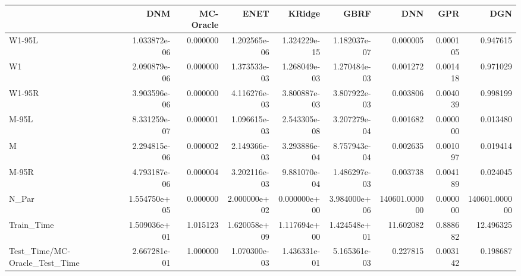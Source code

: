 \begin{tabular}{lrrrrrrrr}
\toprule
{} &           DNM &  MC-Oracle &          ENET &        KRidge &          GBRF &            DNN &       GPR &            DGN \\
\midrule
W1-95L                        &  1.033872e-06 &   0.000000 &  1.202565e-06 &  1.324229e-15 &  1.182037e-07 &       0.000005 &  0.000105 &       0.947615 \\
W1                            &  2.090879e-06 &   0.000000 &  1.373533e-03 &  1.268049e-03 &  1.270484e-03 &       0.001272 &  0.001418 &       0.971029 \\
W1-95R                        &  3.903596e-06 &   0.000000 &  4.116276e-03 &  3.800887e-03 &  3.807922e-03 &       0.003806 &  0.004039 &       0.998199 \\
M-95L                         &  8.331259e-07 &   0.000001 &  1.096615e-03 &  2.543305e-08 &  3.207279e-04 &       0.001682 &  0.000000 &       0.013480 \\
M                             &  2.294815e-06 &   0.000002 &  2.149366e-03 &  3.293886e-04 &  8.757943e-04 &       0.002635 &  0.001097 &       0.019414 \\
M-95R                         &  4.793187e-06 &   0.000004 &  3.202116e-03 &  9.881070e-04 &  1.486297e-03 &       0.003738 &  0.004189 &       0.024045 \\
N\_Par                         &  1.554750e+05 &   0.000000 &  2.000000e+02 &  0.000000e+00 &  3.984000e+06 &  140601.000000 &  0.000000 &  140601.000000 \\
Train\_Time                    &  1.509036e+01 &   1.015123 &  1.620058e+09 &  1.117694e+00 &  1.424548e+01 &      11.602082 &  0.888682 &      12.496325 \\
Test\_Time/MC-Oracle\_Test\_Time &  2.667281e-01 &   1.000000 &  1.070300e-03 &  1.436331e-01 &  5.165361e-03 &       0.227815 &  0.003142 &       0.198687 \\
\bottomrule
\end{tabular}
